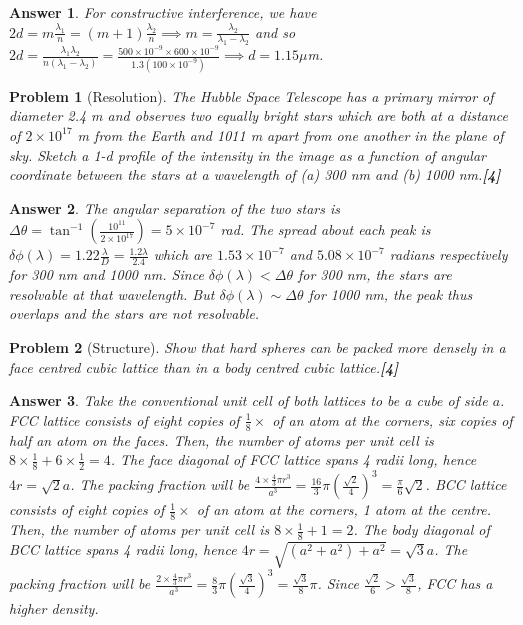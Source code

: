 \documentclass[a4paper]{article}
\newtheorem{ans}{Answer}[subsection]
\theoremstyle{new}
\newtheorem{qns}{Problem}[subsection]
\begin{document}
\begin{ans}
For constructive interference, we have $2d=m\frac{\lambda_1}{n}=(m+1)\frac{\lambda_2}{n}\implies m=\frac{\lambda_2}{\lambda_1-\lambda_2}$ and so $2d=\frac{\lambda_1\lambda_2}{n(\lambda_1-\lambda_2)}=\frac{500\times10^{-9}\times 600\times10^{-9}}{1.3(100\times10^{-9})}\implies d=1.15\mu$m.
\end{ans}
\begin{qns}[Resolution]
The Hubble Space Telescope has a primary mirror of diameter 2.4 m and observes two equally bright stars which are both at a distance of $2\times10^{17}$ m from the Earth and 1011 m apart from one another in the plane of sky. Sketch a 1-d profile of the intensity in the image as a function of angular coordinate between the stars at a wavelength of (a)
300 nm and (b) 1000 nm.\hfill\textbf{[4]}

\begin{mdframed}
\color{darkblue}{The diffraction pattern of a circular aperture of diameter $D$ has its first zero at angular coordinate $1.22\lambda/D$ from the central maximum. The stars are less than $10^9$ m in diameter.}
\end{mdframed}
\end{qns}
\begin{ans}
The angular separation of the two stars is $\Delta\theta=\tan^{-1}(\frac{10^{11}}{2\times10^{17}})=5\times10^{-7}$ rad. The spread about each peak is $\delta\phi(\lambda)=1.22\frac{\lambda}{D}=\frac{1.2\lambda}{2.4}$ which are $1.53\times10^{-7}$ and $5.08\times10^{-7}$ radians respectively for 300 nm and 1000 nm. Since $\delta\phi(\lambda)<\Delta\theta$ for 300 nm, the stars are resolvable at that wavelength. But $\delta\phi(\lambda)\sim\Delta\theta$ for 1000 nm, the peak thus overlaps and the stars are not resolvable.
\end{ans}
\begin{qns}[Structure]
Show that hard spheres can be packed more densely in a face centred cubic lattice than in a body centred cubic lattice.\hfill\textbf{[4]}
\end{qns}
\begin{ans}
Take the conventional unit cell of both lattices to be a cube of side $a$.
FCC lattice consists of eight copies of $\frac{1}{8}\times$ of an atom at the corners, six copies of half an atom on the faces. Then, the number of atoms per unit cell is $8\times\frac{1}{8}+6\times\frac{1}{2}=4$. The face diagonal of FCC lattice spans 4 radii long, hence $4r=\sqrt{2}a$. The packing fraction will be $\frac{4\times\frac{4}{3}\pi r^3}{a^3}=\frac{16}{3}\pi(\frac{\sqrt{2}}{4})^3=\frac{\pi}{6}\sqrt{2}$. BCC lattice consists of eight copies of $\frac{1}{8}\times$ of an atom at the corners, 1 atom at the centre. Then, the number of atoms per unit cell is $8\times\frac{1}{8}+1=2$. The body diagonal of BCC lattice spans 4 radii long, hence $4r=\sqrt{(a^2+a^2)+a^2}=\sqrt{3}a$. The packing fraction will be $\frac{2\times\frac{4}{3}\pi r^3}{a^3}=\frac{8}{3}\pi(\frac{\sqrt{3}}{4})^3=\frac{\sqrt{3}}{8}\pi$. Since $\frac{\sqrt{2}}{6}>\frac{\sqrt{3}}{8}$, FCC has a higher density.
\end{ans}
\end{document}
